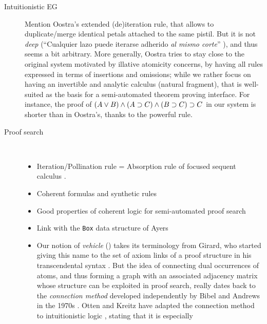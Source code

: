 \begin{procedure}[H]
\begin{description}
  \item[Intuitionistic EG]
    Mention Oostra's extended (de)iteration rule, that allows to duplicate/merge
    identical petals attached to the same pistil. But it is not \emph{deep}
    (``Cualquier lazo puede iterarse adherido \emph{al mismo corte}''
    \cite[p.~46]{oostra_graficos_2010}), and thus seems a bit arbitrary. More
    generally, Oostra tries to stay close to the original system 
    motivated by illative atomicity concerns, by having all rules expressed in
    terms of insertions and omissions; while we rather focus on having an
    invertible and analytic calculus (natural fragment), that is well-suited as
    the basis for a semi-automated theorem proving interface. For instance, the
    proof of $(A \lor B) \land (A \supset C) \land (B \supset C) \supset C$ in our
    system is shorter than in Oostra's, thanks to the powerful  rule.
  \item[Proof search]~\\
    \begin{itemize}
      \item Iteration/Pollination rule = Absorption rule of focused sequent
        calculus .
      \item Coherent formulas and synthetic rules 
      \item Good properties of coherent logic for semi-automated proof search
      \item Link with the \texttt{Box} data structure of Ayers 
      \item Our notion of \emph{vehicle} () takes its
      terminology from Girard, who started giving this name to the set of axiom
      links of a proof structure in his transcendental syntax . But the
      idea of connecting dual occurrences of atoms, and thus forming a graph
      with an associated adjacency matrix whose structure can be exploited in
      proof search, really dates back to the \emph{connection method} developed
      independently by Bibel and Andrews in the 1970s .
      Otten and Kreitz have adapted the connection method to intuitionistic
      logic , stating that it is especially

\end{itemize}
\end{description}
\end{procedure}
